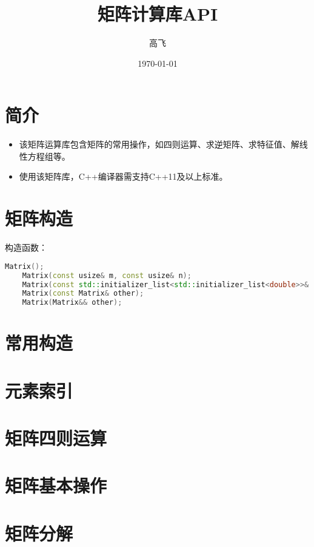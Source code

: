 \documentclass[UTF8]{ctexart}
\title{矩阵计算库API}
\author{高飞}
\date{\today}
\begin{document}
\maketitle
\newpage
\tableofcontents
\newpage

\section{简介}

\begin{itemize}
    \item 该矩阵运算库包含矩阵的常用操作，如四则运算、求逆矩阵、求特征值、解线性方程组等。
    \item 使用该矩阵库，C++编译器需支持C++11及以上标准。
\end{itemize}

\section{矩阵构造}

构造函数：
{
    \setmainfont{Consolas}
    \begin{lstlisting}[language=C++]
    Matrix();
    Matrix(const usize& m, const usize& n);
    Matrix(const std::initializer_list<std::initializer_list<double>>& m);
    Matrix(const Matrix& other);
    Matrix(Matrix&& other);
    \end{lstlisting}
}

\section{常用构造}

\section{元素索引}

\section{矩阵四则运算}

\section{矩阵基本操作}

\section{矩阵分解}
\end{document}
